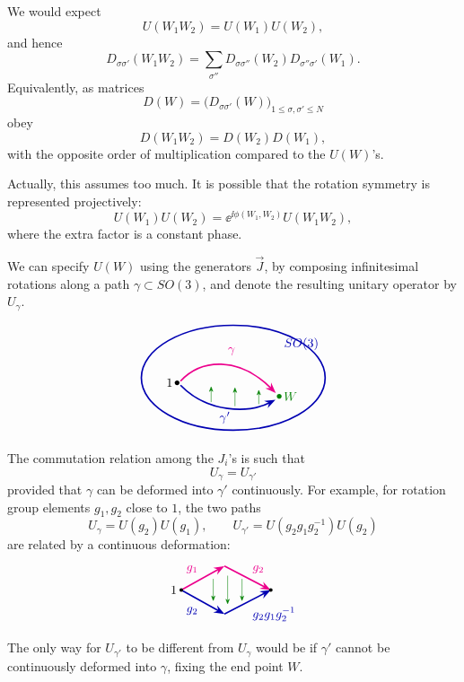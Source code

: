 We would expect
\[
  U(W_1W_2)=U(W_1)U(W_2),
\]
and hence
\[
  D_{\sigma\sigma'}(W_1W_2)
  =
  \sum_{\sigma''}
  D_{\sigma\sigma''}(W_2)D_{\sigma''\sigma'}(W_1).
\]
Equivalently, as matrices
\[
  D(W)=\bigl(D_{\sigma\sigma'}(W)\bigr)_{1\le\sigma,\sigma'\le N}
\]
obey
\[
  D(W_1W_2)=D(W_2)D(W_1),
\]
with the opposite order of multiplication compared to the \(U(W)\)'s.

Actually, this assumes too much.  It is possible that the rotation symmetry is
represented projectively:
\[
  U(W_1)U(W_2)=\ee^{\ii\phi(W_1,W_2)}U(W_1W_2),
\]
where the extra factor is a constant phase.

We can specify \(U(W)\) using the generators \(\vec J\), by composing
infinitesimal rotations along a path \(\gamma\subset SO(3)\), and denote the
resulting unitary operator by \(U_\gamma\).

\[
\begin{tikzpicture}[>=Stealth,scale=0.95]
  \draw[blue!70!black,very thick] (0,0) ellipse (2.7 and 1.55);
  \node[blue!70!black] at (2.0,1.0) {\(SO(3)\)};
  \fill ( -1.65,-0.15) circle (2pt) node[left] {\(1\)};
  \fill[green!50!black] (1.35,-0.55) circle (2pt) node[right] {\(W\)};
  \draw[magenta,very thick,->]
    (-1.55,-0.10).. controls (-0.95,0.55) and (0.15,0.65) .. (1.25,-0.45);
  \node[magenta] at (-0.05,0.78) {\(\gamma\)};
  \draw[blue!70!black,very thick,->]
    (-1.55,-0.22).. controls (-0.75,-1.05) and (0.45,-1.05) .. (1.24,-0.65);
  \node[blue!70!black] at (-0.25,-1.18) {\(\gamma'\)};
  \draw[green!50!black,->] (-0.65,-0.72) -- (-0.65,-0.25);
  \draw[green!50!black,->] (0.05,-0.84) -- (0.05,-0.28);
  \draw[green!50!black,->] (0.75,-0.78) -- (0.75,-0.35);
\end{tikzpicture}
\]

The commutation relation among the \(J_i\)'s is such that
\[
  U_\gamma=U_{\gamma'}
\]
provided that \(\gamma\) can be deformed into \(\gamma'\) continuously.  For
example, for rotation group elements \(g_1,g_2\) close to \(1\), the two paths
\[
  U_\gamma=U(g_2)U(g_1),
\qquad
  U_{\gamma'}=U(g_2g_1g_2^{-1})U(g_2)
\]
are related by a continuous deformation:
\[
\begin{tikzpicture}[>=Stealth,scale=0.9]
  \coordinate (A) at (0,0);
  \coordinate (B) at (1.35,0.75);
  \coordinate (C) at (2.8,0);
  \coordinate (D) at (1.35,-0.75);
  \draw[magenta,very thick,->] (A) -- node[above left] {\(g_1\)} (B);
  \draw[magenta,very thick,->] (B) -- node[above right] {\(g_2\)} (C);
  \draw[blue!70!black,very thick,->] (A) -- node[below left] {\(g_2\)} (D);
  \draw[blue!70!black,very thick,->] (D) -- node[below right] {\(g_2g_1g_2^{-1}\)} (C);
  \draw[green!50!black,->] (1.0,0.35) -- (1.0,-0.35);
  \draw[green!50!black,->] (1.45,0.45) -- (1.45,-0.45);
  \draw[green!50!black,->] (1.9,0.35) -- (1.9,-0.35);
  \fill (A) circle (1.6pt) node[left] {\(1\)};
  \fill (C) circle (1.6pt) node[right] {};
\end{tikzpicture}
\]
The only way for \(U_{\gamma'}\) to be different from \(U_\gamma\) would be if
\(\gamma'\) cannot be continuously deformed into \(\gamma\), fixing the end
point \(W\).

